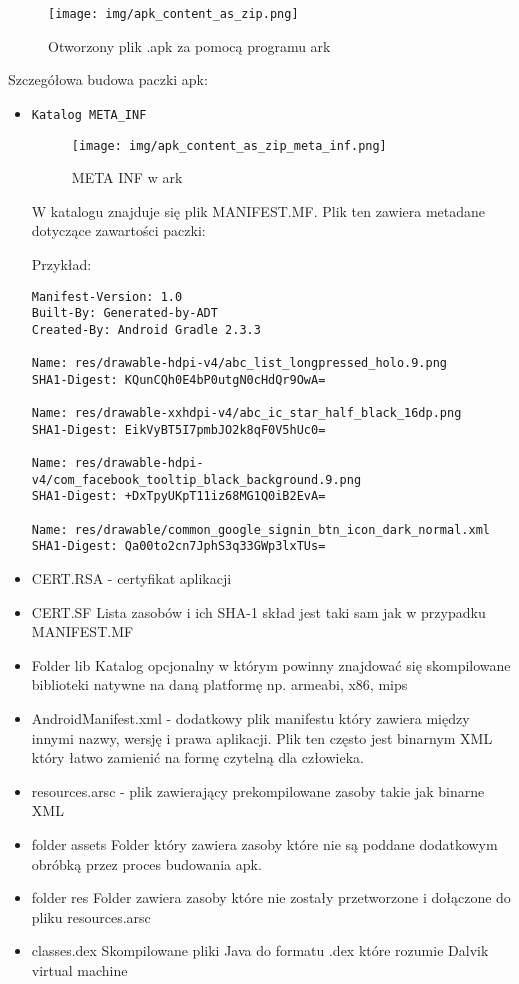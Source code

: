 \documentclass[12pt,a4paper,leqno,oneside,titlepage]{book}
\begin{document}
\begin{figure}[h!]
	\centering
	\texttt{[image: img/apk\_content\_as\_zip.png]}
	\caption{Otworzony plik .apk za pomocą programu ark}
\end{figure}

Szczegółowa budowa paczki apk:
\begin{itemize}
\item \texttt{Katalog META\_INF}

\begin{figure}[h!]
	\centering
	\texttt{[image: img/apk\_content\_as\_zip\_meta\_inf.png]}
	\caption{META INF w ark}
\end{figure}

W katalogu znajduje się plik MANIFEST.MF. Plik ten zawiera metadane dotyczące zawartości paczki:

Przykład:

\begin{lstlisting}
Manifest-Version: 1.0
Built-By: Generated-by-ADT
Created-By: Android Gradle 2.3.3

Name: res/drawable-hdpi-v4/abc_list_longpressed_holo.9.png
SHA1-Digest: KQunCQh0E4bP0utgN0cHdQr9OwA=

Name: res/drawable-xxhdpi-v4/abc_ic_star_half_black_16dp.png
SHA1-Digest: EikVyBT5I7pmbJO2k8qF0V5hUc0=

Name: res/drawable-hdpi-v4/com_facebook_tooltip_black_background.9.png
SHA1-Digest: +DxTpyUKpT11iz68MG1Q0iB2EvA=

Name: res/drawable/common_google_signin_btn_icon_dark_normal.xml
SHA1-Digest: Qa00to2cn7JphS3q33GWp3lxTUs=
\end{lstlisting}

\item CERT.RSA - certyfikat aplikacji
\item CERT.SF
Lista zasobów i ich SHA-1 skład jest taki sam jak w przypadku MANIFEST.MF


\item Folder lib
Katalog opcjonalny w którym powinny znajdować się skompilowane biblioteki natywne na daną platformę np. armeabi, x86, mips

\item AndroidManifest.xml - dodatkowy plik manifestu który zawiera między innymi nazwy, wersję i prawa aplikacji. Plik ten często jest binarnym XML który łatwo zamienić na formę czytelną dla człowieka.

\item resources.arsc - plik zawierający prekompilowane zasoby takie jak binarne XML

\item folder assets
Folder który zawiera zasoby które nie są poddane dodatkowym obróbką przez proces budowania apk.

\item folder res
Folder zawiera zasoby które nie zostały przetworzone i dołączone do pliku resources.arsc

\item classes.dex Skompilowane pliki Java do formatu .dex które rozumie Dalvik virtual machine

\end{itemize}
\end{document}
